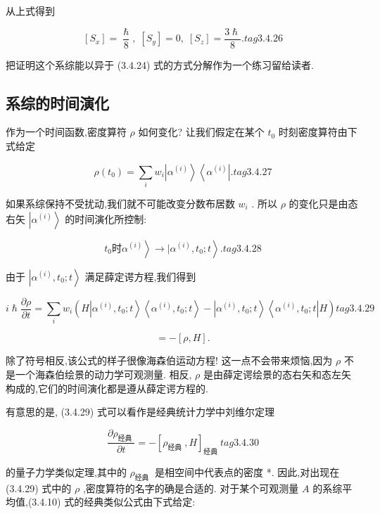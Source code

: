 从上式得到

$$
\left\lbrack {S}_{x}\right\rbrack = \frac{\hslash }{8},\;\left\lbrack {S}_{y}\right\rbrack = 0,\;\left\lbrack {S}_{z}\right\rbrack = \frac{3\hslash }{8}. tag{3. 4.26}
$$

把证明这个系综能以异于 (3.4.24) 式的方式分解作为一个练习留给读者.

\subsection{系综的时间演化}

作为一个时间函数,密度算符 $\rho$ 如何变化? 让我们假定在某个 ${t}_{0}$ 时刻密度算符由下式给定

$$
\rho \left( {t}_{0}\right) = \mathop{\sum }\limits_{i}{w}_{i}\left| {\alpha }^{\left( i\right) }\right\rangle \left\langle {\alpha }^{\left( i\right) }\right| . tag{3. 4.27}
$$

如果系综保持不受扰动,我们就不可能改变分数布居数 ${w}_{i}$ . 所以 $\rho$ 的变化只是由态右矢 $\left| {\alpha }^{\left( i\right) }\right\rangle$ 的时间演化所控制:

$$
{t}_{0}\text{时}\left. {\left. {\alpha }^{\left( i\right) }\right\rangle \rightarrow \mid {\alpha }^{\left( i\right) },{t}_{0};t}\right\rangle \text{.} tag{3. 4.28}
$$

由于 $\left| {{\alpha }^{\left( i\right) },{t}_{0};t}\right\rangle$ 满足薛定谔方程,我们得到

$$
i\hslash \frac{\partial \rho }{\partial t} = \mathop{\sum }\limits_{i}{w}_{i}\left( {H\left| {{\alpha }^{\left( i\right) },{t}_{0};t}\right\rangle \left\langle {{\alpha }^{\left( i\right) },{t}_{0};t}\right\rangle - \left| {{\alpha }^{\left( i\right) },{t}_{0};t}\right\rangle \left\langle {{\alpha }^{\left( i\right) },{t}_{0};t}\right| H}\right) tag{3. 4.29}
$$

$$
= - \left\lbrack {\rho, H}\right\rbrack \text{.}
$$

除了符号相反,该公式的样子很像海森伯运动方程! 这一点不会带来烦恼,因为 $\rho$ 不是一个海森伯绘景的动力学可观测量. 相反, $\rho$ 是由薛定谔绘景的态右矢和态左矢构成的,它们的时间演化都是遵从薛定谔方程的.

有意思的是, (3.4.29) 式可以看作是经典统计力学中刘维尔定理

$$
\frac{\partial {\rho }_{\text{经典 }}}{\partial t} = - {\left\lbrack {\rho }_{\text{经典 }}, H\right\rbrack }_{\text{经典 }} tag{3.4.30}
$$

的量子力学类似定理,其中的 ${\rho }_{\text{经典 }}$ 是相空间中代表点的密度 *. 因此,对出现在 (3.4.29) 式中的 $\rho$ ,密度算符的名字的确是合适的. 对于某个可观测量 $A$ 的系综平均值,(3.4.10) 式的经典类似公式由下式给定:

